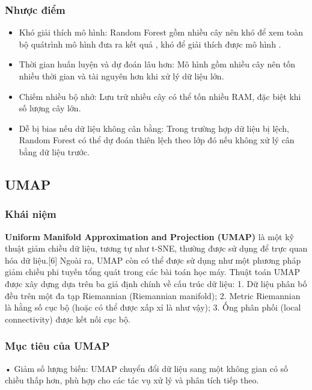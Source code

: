 \documentclass[
]{article}
\begin{document}
\subsubsection{Nhược điểm}\label{nhux1b0ux1ee3c-ux111iux1ec3m-3}

\begin{itemize}
\item
  Khó giải thích mô hình: Random Forest gồm nhiều cây nên khó để xem
  toàn bộ quátrình mô hình đưa ra kết quả , khó để giải thích được mô
  hình .
\item
  Thời gian huấn luyện và dự đoán lâu hơn: Mô hình gồm nhiều cây nên tốn
  nhiều thời gian và tài nguyên hơn khi xử lý dữ liệu lớn.
\item
  Chiếm nhiều bộ nhớ: Lưu trữ nhiều cây có thể tốn nhiều RAM, đặc biệt
  khi số lượng cây lớn.
\item
  Dễ bị bias nếu dữ liệu không cân bằng: Trong trường hợp dữ liệu bị
  lệch, Random Forest có thể dự đoán thiên lệch theo lớp đó nếu không xử
  lý cân bằng dữ liệu trước.
\end{itemize}

\subsection{UMAP}\label{umap}

\subsubsection{Khái niệm}\label{khuxe1i-niux1ec7m-5}

\textbf{Uniform Manifold Approximation and Projection (UMAP)} là một kỹ
thuật giảm chiều dữ liệu, tương tự như t-SNE, thường được sử dụng để
trực quan hóa dữ liệu.{[}6{]} Ngoài ra, UMAP còn có thể được sử dụng như
một phương pháp giảm chiều phi tuyến tổng quát trong các bài toán học
máy. Thuật toán UMAP được xây dựng dựa trên ba giả định chính về cấu
trúc dữ liệu: 1. Dữ liệu phân bố đều trên một đa tạp Riemannian
(Riemannian manifold); 2. Metric Riemannian là hằng số cục bộ (hoặc có
thể được xấp xỉ là như vậy); 3. Ống phân phối (local connectivity) được
kết nối cục bộ.

\subsubsection{Mục tiêu của UMAP}\label{mux1ee5c-tiuxeau-cux1ee7a-umap}

• Giảm số lượng biến: UMAP chuyển đổi dữ liệu sang một không gian có số
chiều thấp hơn, phù hợp cho các tác vụ xử lý và phân tích tiếp theo.
\end{document}
